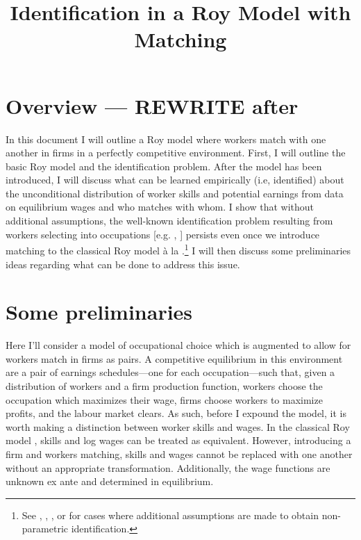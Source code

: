 \documentclass[12 pt]{article}
\title{Identification in a Roy Model with Matching}
\author{}
\date{}
\begin{document}
\maketitle
\vspace*{-2cm}
\onehalfspacing

\section{Overview --- REWRITE after}

In this document I will outline a Roy model where workers match with one another in firms in a perfectly competitive environment. First, I will outline the basic Roy model and the identification problem. After the model has been introduced, I will discuss what can be learned empirically (i.e, identified) about the unconditional distribution of worker skills and potential earnings from data on equilibrium wages and who matches with whom. I show that without additional assumptions, the well-known identification problem resulting from workers selecting into occupations [e.g. \citet{heckman1990empirical}, \citet{french2011identification}] persists even once we introduce matching to the classical Roy model \`{a} la \citet{mak2025occupational}.\footnote{See \citet{heckman1990empirical}, \citet{bayer2011nonparametric}, \citet{buera2006non}, or \citet{mourifie2020sharp} for cases where additional assumptions are made to obtain non-parametric identification.} I will then discuss some preliminaries ideas regarding what can be done to address this issue.  

\section{Some preliminaries}

Here I'll consider a model of occupational choice \citep{roy1951some} which is augmented to allow for workers match in firms as pairs. A competitive equilibrium in this environment are a pair of earnings schedules---one for each occupation---such that, given a distribution of workers and a firm production function, workers choose the occupation which maximizes their wage, firms choose workers to maximize profits, and the labour market clears. As such, before I expound the model, it is worth making a distinction between worker skills and wages. In the classical Roy model \citep{heckman1990empirical}, skills and log wages can be treated as equivalent. However, introducing a firm and workers matching, skills and wages cannot be replaced with one another without an appropriate transformation. Additionally, the wage functions are unknown ex ante and determined in equilibrium.
\end{document}
